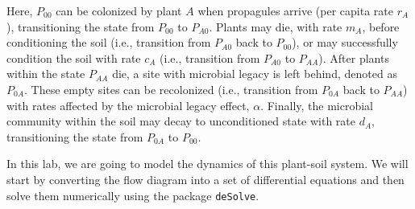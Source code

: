 \documentclass[
]{book}
\begin{document}
Here, \(P_{00}\) can be colonized by plant \(A\) when propagules arrive (per capita rate \(r_{A}\)), transitioning the state from \(P_{00}\) to \(P_{A0}\). Plants may die, with rate \(m_{A}\), before conditioning the soil (i.e., transition from \(P_{A0}\) back to \(P_{00}\)), or may successfully condition the soil with rate \(c_{A}\) (i.e., transition from \(P_{A0}\) to \(P_{AA}\)). After plants within the state \(P_{AA}\) die, a site with microbial legacy is left behind, denoted as \(P_{0A}\). These empty sites can be recolonized (i.e., transition from \(P_{0A}\) back to \(P_{AA}\)) with rates affected by the microbial legacy effect, \(\alpha\). Finally, the microbial community within the soil may decay to unconditioned state with rate \(d_{A}\), transitioning the state from \(P_{0A}\) to \(P_{00}\).

In this lab, we are going to model the dynamics of this plant-soil system. We will start by converting the flow diagram into a set of differential equations and then solve them numerically using the package \texttt{deSolve}.
\end{document}

